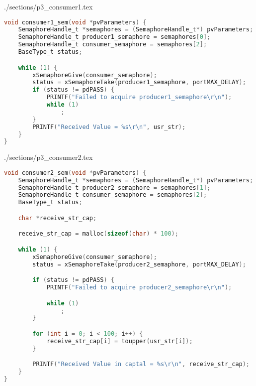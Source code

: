 \begin{filecontents}[overwrite]{./sections/p3_consumer1.tex}
\begin{lstlisting}[language=c,caption=Problem 3 Consumer 1 Task, label=list:p3_cons1]
void consumer1_sem(void *pvParameters) {
    SemaphoreHandle_t *semaphores = (SemaphoreHandle_t*) pvParameters;
    SemaphoreHandle_t producer1_semaphore = semaphores[0];
    SemaphoreHandle_t consumer_semaphore = semaphores[2];
    BaseType_t status;

    while (1) {
        xSemaphoreGive(consumer_semaphore);
        status = xSemaphoreTake(producer1_semaphore, portMAX_DELAY);
        if (status != pdPASS) {
            PRINTF("Failed to acquire producer1_semaphore\r\n");
            while (1)
                ;
        }
        PRINTF("Received Value = %s\r\n", usr_str);
    }
}
\end{lstlisting}
\end{filecontents}

\begin{filecontents}[overwrite]{./sections/p3_consumer2.tex}
\begin{lstlisting}[language=c,caption=Problem 3 Consumer 2 Task, label=list:p3_cons2]
void consumer2_sem(void *pvParameters) {
    SemaphoreHandle_t *semaphores = (SemaphoreHandle_t*) pvParameters;
    SemaphoreHandle_t producer2_semaphore = semaphores[1];
    SemaphoreHandle_t consumer_semaphore = semaphores[2];
    BaseType_t status;

    char *receive_str_cap;

    receive_str_cap = malloc(sizeof(char) * 100);

    while (1) {
        xSemaphoreGive(consumer_semaphore);
        status = xSemaphoreTake(producer2_semaphore, portMAX_DELAY);

        if (status != pdPASS) {
            PRINTF("Failed to acquire producer2_semaphore\r\n");

            while (1)
                ;
        }

        for (int i = 0; i < 100; i++) {
            receive_str_cap[i] = toupper(usr_str[i]);
        }

        PRINTF("Received Value in captal = %s\r\n", receive_str_cap);
    }
}
\end{lstlisting}
\end{filecontents}

